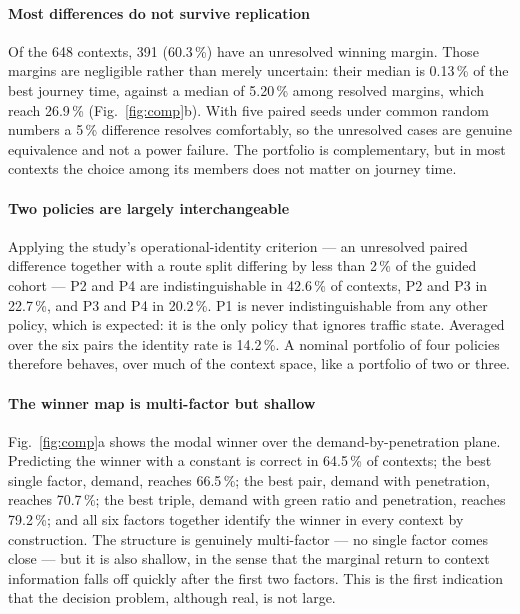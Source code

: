 \documentclass[preprint,12pt]{elsarticle}
\begin{document}
\paragraph{Most differences do not survive replication}
Of the 648 contexts, 391 (60.3\,\%) have an unresolved winning margin. Those
margins are negligible rather than merely uncertain: their median is 0.13\,\% of
the best journey time, against a median of 5.20\,\% among resolved margins, which
reach 26.9\,\% (Fig.~\ref{fig:comp}b). With five paired seeds under common random
numbers a 5\,\% difference resolves comfortably, so the unresolved cases are
genuine equivalence and not a power failure. The portfolio is complementary, but
in most contexts the choice among its members does not matter on journey time.

\paragraph{Two policies are largely interchangeable}
Applying the study's operational-identity criterion --- an unresolved paired
difference together with a route split differing by less than 2\,\% of the guided
cohort --- P2 and P4 are indistinguishable in 42.6\,\% of contexts, P2 and P3 in
22.7\,\%, and P3 and P4 in 20.2\,\%. P1 is never indistinguishable from any other
policy, which is expected: it is the only policy that ignores traffic state.
Averaged over the six pairs the identity rate is 14.2\,\%. A nominal portfolio of
four policies therefore behaves, over much of the context space, like a portfolio
of two or three.

\paragraph{The winner map is multi-factor but shallow}
Fig.~\ref{fig:comp}a shows the modal winner over the demand-by-penetration
plane. Predicting the winner with a constant is correct in 64.5\,\% of contexts;
the best single factor, demand, reaches 66.5\,\%; the best pair, demand with
penetration, reaches 70.7\,\%; the best triple, demand with green ratio and
penetration, reaches 79.2\,\%; and all six factors together identify the winner
in every context by construction. The structure is genuinely multi-factor --- no
single factor comes close --- but it is also shallow, in the sense that the
marginal return to context information falls off quickly after the first two
factors. This is the first indication that the decision problem, although real,
is not large.
\end{document}
